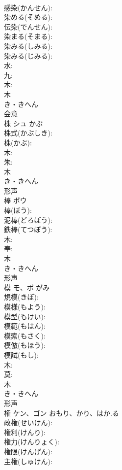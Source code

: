 \documentclass[8pt]{extreport}
\begin{document}
\begin{CJK}{UTF8}{min}
\\	感染(かんせん): 
\\	染める(そめる): 
\\	伝染(でんせん): 
\\	染まる(そまる): 
\\	染みる(しみる): 
\\	染みる(じみる): 
\\	水: 
\\	九: 
\\	木: 
\\	木	
\\	き・きへん	
\\	会意 
\\	株	シュ	かぶ		
\\	株式(かぶしき): 
\\	株(かぶ): 
\\	木: 
\\	朱: 
\\	木	
\\	き・きへん	
\\	形声 
\\	棒	ボウ			
\\	棒(ぼう): 
\\	泥棒(どろぼう): 
\\	鉄棒(てつぼう): 
\\	木: 
\\	奉: 
\\	木	
\\	き・きへん	
\\	形声 
\\	模	モ、ボ		がみ	
\\	規模(きぼ): 
\\	模様(もよう): 
\\	模型(もけい): 
\\	模範(もはん): 
\\	模索(もさく): 
\\	模倣(もほう): 
\\	模試(もし): 
\\	木: 
\\	莫: 
\\	木	
\\	き・きへん	
\\	形声 
\\	権	ケン、ゴン	おもり、かり、はか.る		
\\	政権(せいけん): 
\\	権利(けんり): 
\\	権力(けんりょく): 
\\	権限(けんげん): 
\\	主権(しゅけん): 

\end{CJK}
\end{document}
